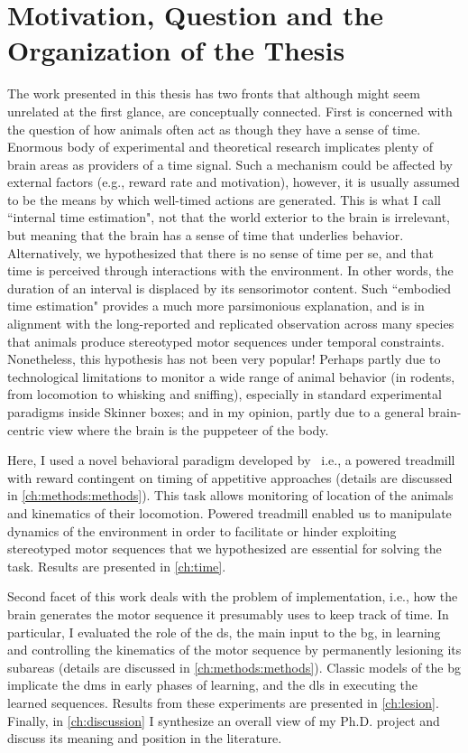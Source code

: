 \section[Motivation, Question and More]{Motivation, Question and the Organization of the Thesis}
\label{intro:question}

The work presented in this thesis has two fronts that although might seem unrelated at the first glance, are conceptually connected.
First is concerned with the question of how animals often act as though they have a sense of time.
Enormous body of experimental and theoretical research implicates plenty of brain areas as providers of a time signal.
Such a mechanism could be affected by external factors (e.g., reward rate and motivation), however, it is usually assumed to be the means by which well-timed actions are generated.
This is what I call ``internal time estimation", not that the world exterior to the brain is irrelevant, but meaning that the brain has a sense of time that underlies behavior.
Alternatively, we hypothesized that there is no sense of time per se, and that time is perceived through interactions with the environment.
In other words, the duration of an interval is displaced by its sensorimotor content.
Such ``embodied time estimation" provides a much more parsimonious explanation, and is in alignment with the long-reported and replicated observation across many species that animals produce stereotyped motor sequences under temporal constraints.
Nonetheless, this hypothesis has not been very popular!
Perhaps partly due to technological limitations to monitor a wide range of animal behavior (in rodents, from locomotion to whisking and sniffing), especially in standard experimental paradigms inside Skinner boxes; and in my opinion, partly due to a general brain-centric view where the brain is the puppeteer of the body.
\par
Here, I used a novel behavioral paradigm developed by~\citeauthor{Rueda2015NN} i.e., a powered treadmill with reward contingent on timing of appetitive approaches (details are discussed in \autoref{ch:methods:methods}).
This task allows monitoring of location of the animals and kinematics of their locomotion.
Powered treadmill enabled us to manipulate dynamics of the environment in order to facilitate or hinder exploiting stereotyped motor sequences that we hypothesized are essential for solving the task.
Results are presented in \autoref{ch:time}.
\par
Second facet of this work deals with the problem of implementation, i.e., how the brain generates the motor sequence it presumably uses to keep track of time.
In particular, I evaluated the role of the \gls{ds}, the main input to the \gls{bg}, in learning and controlling the kinematics of the motor sequence by permanently lesioning its subareas (details are discussed in \autoref{ch:methods:methods}).
Classic models of the \gls{bg} implicate the \gls{dms} in early phases of learning, and the \gls{dls} in executing the learned sequences.
Results from these experiments are presented in \autoref{ch:lesion}.
Finally, in \autoref{ch:discussion} I synthesize an overall view of my Ph.D. project and discuss its meaning and position in the literature.